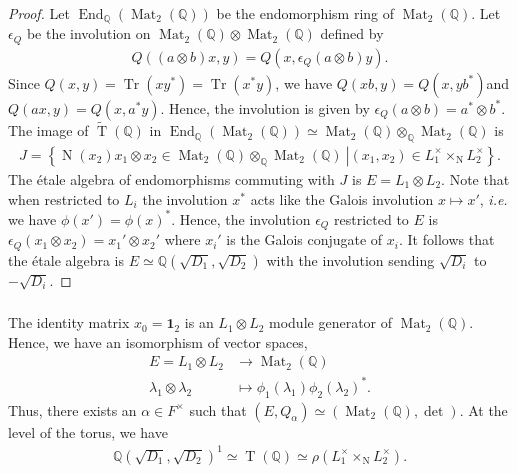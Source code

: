 \documentclass[11pt]{article} %
\newcommand{\8}{\infty}
\newcommand{\id}{\mathbf{1}}
\newcommand{\Tbf}{\operatorname{T}}
\newcommand{\Ttil}{\widetilde{\operatorname{T}}}
\newcommand{\Q}{\mathbb{Q}}
\newcommand{\End}{\operatorname{End}}
\newcommand{\Tr}{\operatorname{Tr}}
\newcommand{\N}{\operatorname{N}}
\newcommand{\Mat}{\operatorname{Mat}}
\theoremstyle{mytheoremstyle}
\theoremstyle{remark}
\numberwithin{equation}{section}
\begin{document}
\begin{proof}
Let $\End_\Q(\Mat_2(\Q))$ be the endomorphism ring of $\Mat_2(\Q)$. Let $\epsilon_Q$ be the involution on $\Mat_2(\Q) \otimes \Mat_2(\Q)$ defined by
\begin{align}
    Q((a \otimes b)x,y)=Q(x,\epsilon_Q(a \otimes b)y).
\end{align}
Since $Q(x,y)=\Tr(xy^*)=\Tr(x^\ast y)$, we have $Q(xb,y)=Q(x,yb^*)$and $Q(ax,y)=Q(x,a^*y)$. Hence, the involution is given by $\epsilon_Q(a\otimes b)=a^* \otimes b^*$. The image of $\Ttil(\Q)$ in $\End_\Q(\Mat_2(\Q)) \simeq \Mat_2(\Q) \otimes_\Q \Mat_2(\Q)$ is 
 \begin{align}
     J=\left \{ \left . \N(x_2)x_1 \otimes x_2 \in \Mat_2(\Q) \otimes_\Q \Mat_2(\Q) \ \right \vert (x_1,x_2) \in L_1^{\times} \times_{\N} L_2^{\times} \right \}.
 \end{align} The \'etale algebra of endomorphisms commuting with $J$ is $E=L_1\otimes L_2$. Note that when restricted to $L_i$ the involution $x^*$ acts like the Galois involution $x \mapsto x'$, {\em i.e.} we have $\phi(x')=\phi(x)^*$. Hence, the involution $\epsilon_Q$ restricted to $E$ is $ \epsilon_Q(x_1 \otimes x_2) = x_1' \otimes x_2'$ where $x_i'$ is the Galois conjugate of $x_i$. It follows that the \'etale algebra is $E \simeq \Q(\sqrt{D_1},\sqrt{D_2})$ with the involution sending $\sqrt{D_i}$ to $-\sqrt{D_i}$.
 \end{proof}
 
\subsubsection{} The identity matrix $x_0=\id_2$ is an $L_1 \otimes L_2$ module generator of $\Mat_2(\Q)$. Hence, we have an isomorphism of vector spaces,
 \begin{align} \label{vspaceiso}
     E=L_1 \otimes L_2 & \longrightarrow \Mat_2(\Q) \nonumber \\
     \lambda_1 \otimes \lambda_2 & \longmapsto \phi_1(\lambda_1)\phi_2(\lambda_2)^{\ast}.
 \end{align}
Thus, there exists an $\alpha \in F^\times$ such that $(E,Q_\alpha)\simeq (\Mat_2(\Q),\det)$.
At the level of the torus, we have
\begin{align} \label{quadiso2}
    \Q(\sqrt{D_1},\sqrt{D_2})^1 \simeq \Tbf(\Q) \simeq \rho \left ( L_1^\times \times_{\N} L_2^\times \right ).
\end{align}
\end{document}
